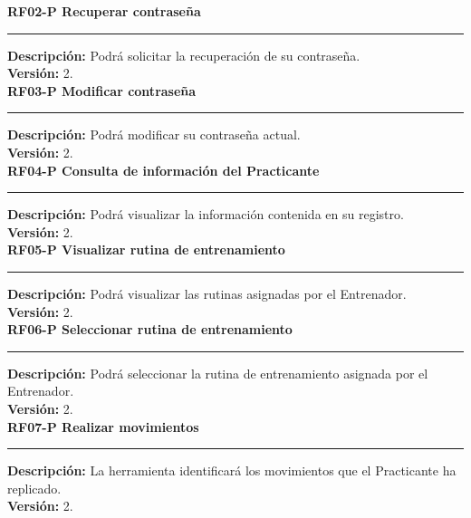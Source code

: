 \textbf{\textcolor[rgb]{0, 0, 0.545098}{RF02-P \hspace{2cm} Recuperar contraseña}}\\
\rule[3mm]{17cm}{0.1mm}
\label{rf:RF02-P}
\textbf{Descripción: } Podrá solicitar la recuperación de su contraseña. \\
\textbf{Versión: } 2. \\

\textbf{\textcolor[rgb]{0, 0, 0.545098}{RF03-P \hspace{2cm} Modificar contraseña}}\\
\rule[3mm]{17cm}{0.1mm}
\label{rf:RF03-P}
\textbf{Descripción: } Podrá modificar su contraseña actual. \\
\textbf{Versión: } 2. \\

\textbf{\textcolor[rgb]{0, 0, 0.545098}{RF04-P \hspace{2cm} Consulta de información del Practicante}}\\
\rule[3mm]{17cm}{0.1mm}
\label{rf:RF04-P}
\textbf{Descripción: } Podrá visualizar la información contenida en su registro. \\
\textbf{Versión: } 2. \\

\textbf{\textcolor[rgb]{0, 0, 0.545098}{RF05-P \hspace{2cm} Visualizar rutina de entrenamiento}}\\
\rule[3mm]{17cm}{0.1mm}
\label{rf:RF05-P}
\textbf{Descripción: } Podrá visualizar las rutinas asignadas por el Entrenador. \\
\textbf{Versión: } 2. \\

\textbf{\textcolor[rgb]{0, 0, 0.545098}{RF06-P \hspace{2cm} Seleccionar rutina de entrenamiento}}\\
\rule[3mm]{17cm}{0.1mm}
\label{rf:RF06-P}
\textbf{Descripción: } Podrá seleccionar la rutina de entrenamiento asignada por el Entrenador. \\
\textbf{Versión: } 2. \\

\textbf{\textcolor[rgb]{0, 0, 0.545098}{RF07-P \hspace{2cm} Realizar movimientos}}\\
\rule[3mm]{17cm}{0.1mm}
\label{rf:RF07-P}
\textbf{Descripción: } La herramienta identificará los movimientos que el Practicante ha replicado. \\
\textbf{Versión: } 2. \\

